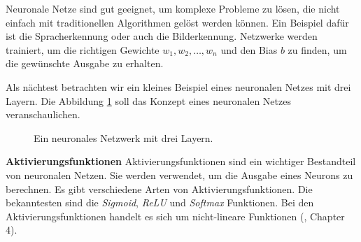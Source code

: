 \documentclass[11pt,a4paper]{article}
\begin{document}
\noindent
Neuronale Netze sind gut geeignet, um komplexe Probleme zu lösen, die nicht einfach mit
traditionellen Algorithmen gelöst werden können. Ein Beispiel dafür ist die Spracherkennung oder
auch die Bilderkennung. Netzwerke werden trainiert, um die richtigen Gewichte
\(w_{1}, w_{2}, \dots, w_{n}\) und den Bias \(b\) zu finden, um die gewünschte Ausgabe zu erhalten.

\noindent \newline
Als nächtest betrachten wir ein kleines Beispiel eines neuronalen Netzes mit drei Layern.
Die Abbildung \ref{fig:neural_network} soll das Konzept eines neuronalen Netzes veranschaulichen.

\vspace{0.5cm}

\begin{figure}[h!]
	\centering
	\caption{Ein neuronales Netzwerk mit drei Layern.}
	\label{fig:neural_network}
\end{figure}


\noindent \newline \textbf{Aktivierungsfunktionen} \newline
Aktivierungsfunktionen sind ein wichtiger Bestandteil von neuronalen Netzen. Sie werden verwendet,
um die Ausgabe eines Neurons zu berechnen. Es gibt verschiedene Arten von Aktivierungsfunktionen.
Die bekanntesten sind die \textit{Sigmoid}, \textit{ReLU} und \textit{Softmax} Funktionen. Bei den 
Aktivierungsfunktionen handelt es sich um nicht-lineare Funktionen (\cite{weidman2019deep}, 
Chapter 4).
\end{document}
